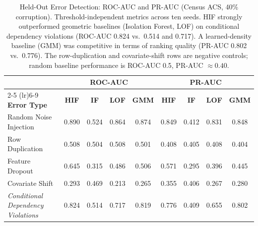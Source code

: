 \documentclass[pdflatex,sn-mathphys-num]{sn-jnl}
\theoremstyle{thmstyleone}%
\theoremstyle{thmstyletwo}%
\theoremstyle{thmstylethree}%
\begin{document}
\begin{table}[htbp]
\centering
\caption{Held-Out Error Detection: ROC-AUC and PR-AUC (Census ACS, 40\% corruption). Threshold-independent metrics across ten seeds. HIF strongly outperformed geometric baselines (Isolation Forest, LOF) on conditional dependency violations (ROC-AUC 0.824 vs.\ 0.514 and 0.717). A learned-density baseline (GMM) was competitive in terms of ranking quality (PR-AUC 0.802 vs.\ 0.776). The row-duplication and covariate-shift rows are negative controls; random baseline performance is ROC-AUC 0.5, PR-AUC $\approx 0.40$.}
\label{tab:heldout_roc}
\footnotesize
\setlength{\tabcolsep}{2pt}
\begin{tabular}{@{}lcccccccc@{}}
\toprule
& \multicolumn{4}{c}{\textbf{ROC-AUC}} & \multicolumn{4}{c}{\textbf{PR-AUC}} \\
\cmidrule(lr){2-5} \cmidrule(lr){6-9}
\textbf{Error Type} & \textbf{HIF} & \textbf{IF} & \textbf{LOF} & \textbf{GMM} & \textbf{HIF} & \textbf{IF} & \textbf{LOF} & \textbf{GMM} \\
\midrule
Random Noise Injection & 0.890 & 0.524 & 0.864 & 0.874 & 0.849 & 0.412 & 0.831 & 0.848 \\
Row Duplication & 0.508 & 0.504 & 0.508 & 0.501 & 0.408 & 0.405 & 0.408 & 0.404 \\
Feature Dropout & 0.645 & 0.315 & 0.486 & 0.506 & 0.571 & 0.295 & 0.396 & 0.445 \\
Covariate Shift & 0.293 & 0.469 & 0.213 & 0.265 & 0.355 & 0.406 & 0.267 & 0.280 \\
\midrule
\textit{Conditional Dependency Violations} & 0.824 & 0.514 & 0.717 & 0.819 & 0.776 & 0.409 & 0.655 & 0.802 \\
\bottomrule
\end{tabular}
\end{table}
\end{document}
